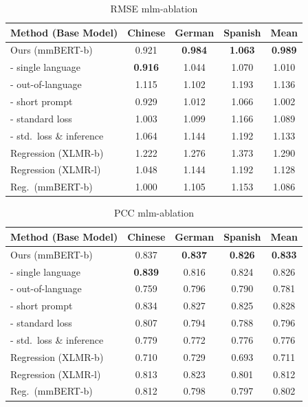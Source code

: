 \begin{table}[t]
\setlength{\tabcolsep}{3.1pt}
\footnotesize
\centering
\begin{tabularx}{\linewidth}{Xcccc}
\toprule
Method (Base Model) & Chinese & German & Spanish & Mean \\
\midrule
Ours (mmBERT-b) & 0.921 & \textbf{0.984} & \textbf{1.063} & \textbf{0.989} \\
- single language & \textbf{0.916} & 1.044 & 1.070 & 1.010 \\
- out-of-language & 1.115 & 1.102 & 1.193 & 1.136 \\
- short prompt & 0.929 & 1.012 & 1.066 & 1.002 \\
- standard loss & 1.003 & 1.099 & 1.166 & 1.089 \\
- std.\ loss \& inference & 1.064 & 1.144 & 1.192 & 1.133 \\
\midrule
Regression (XLMR-b) & 1.222 & 1.276 & 1.373 & 1.290 \\
Regression (XLMR-l) & 1.048 & 1.144 & 1.192 & 1.128 \\
Reg.\ (mmBERT-b) & 1.000 & 1.105 & 1.153 & 1.086 \\
\bottomrule
\end{tabularx}
\caption{RMSE mlm-ablation}
\label{tab:rmse-mlm-ablation}
\end{table}

\begin{table}[t]
\setlength{\tabcolsep}{3.1pt}
\footnotesize
\centering
\begin{tabularx}{\linewidth}{Xcccc}
\toprule
Method (Base Model) & Chinese & German & Spanish & Mean \\
\midrule
Ours (mmBERT-b) & 0.837 & \textbf{0.837} & \textbf{0.826} & \textbf{0.833} \\
- single language & \textbf{0.839} & 0.816 & 0.824 & 0.826 \\
- out-of-language & 0.759 & 0.796 & 0.790 & 0.781 \\
- short prompt & 0.834 & 0.827 & 0.825 & 0.828 \\
- standard loss & 0.807 & 0.794 & 0.788 & 0.796 \\
- std.\ loss \& inference & 0.779 & 0.772 & 0.776 & 0.776 \\
\midrule
Regression (XLMR-b) & 0.710 & 0.729 & 0.693 & 0.711 \\
Regression (XLMR-l) & 0.813 & 0.823 & 0.801 & 0.812 \\
Reg.\ (mmBERT-b) & 0.812 & 0.798 & 0.797 & 0.802 \\
\bottomrule
\end{tabularx}
\caption{PCC mlm-ablation}
\label{tab:pcc-mlm-ablation}
\end{table}

